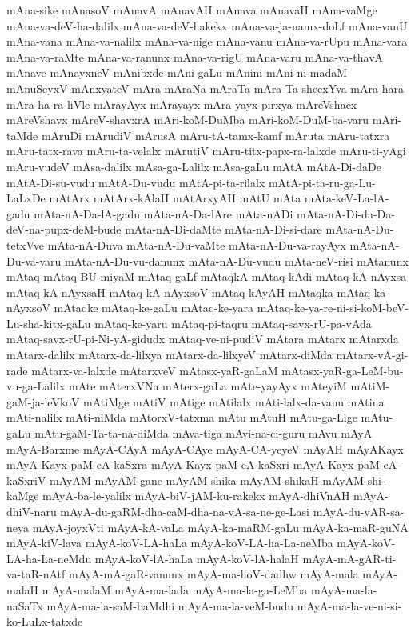 {mAna-sike
mAnasoV
mAnavA
mAnavAH
mAnava
mAnavaH
mAna-vaMge
mAna-va-deV-ha-dalilx
mAna-va-deV-hakekx
mAna-va-ja-namx-doLf
mAna-vanU
mAna-vana
mAna-va-nalilx
mAna-va-nige
mAna-vanu
mAna-va-rUpu
mAna-vara
mAna-va-raMte
mAna-va-ranunx
mAna-va-rigU
mAna-varu
mAna-va-thavA
mAnave
mAnayxneV
mAnibxde
mAni-gaLu
mAnini
mAni-ni-madaM
mAnuSeyxV
mAnxyateV
mAra
mAraNa
mAraTa
mAra-Ta-shecxYva
mAra-hara
mAra-ha-ra-liVle
mArayAyx
mArayayx
mAra-yayx-pirxya
mAreVshacx
mAreVshavx
mAreV-shavxrA
mAri-koM-DuMba
mAri-koM-DuM-ba-varu
mAri-taMde
mAruDi
mArudiV
mArusA
mAru-tA-tamx-kamf
mAruta
mAru-tatxra
mAru-tatx-rava
mAru-ta-velalx
mArutiV
mAru-titx-papx-ra-lalxde
mAru-ti-yAgi
mAru-vudeV
mAsa-dalilx
mAsa-ga-Lalilx
mAsa-gaLu
mAtA
mAtA-Di-daDe
mAtA-Di-su-vudu
mAtA-Du-vudu
mAtA-pi-ta-rilalx
mAtA-pi-ta-ru-ga-Lu-LaLxDe
mAtArx
mAtArx-kAlaH
mAtArxyAH
mAtU
mAta
mAta-keV-La-lA-gadu
mAta-nA-Da-lA-gadu
mAta-nA-Da-lAre
mAta-nADi
mAta-nA-Di-da-Da-deV-na-pupx-deM-bude
mAta-nA-Di-daMte
mAta-nA-Di-si-dare
mAta-nA-Du-tetxVve
mAta-nA-Duva
mAta-nA-Du-vaMte
mAta-nA-Du-va-rayAyx
mAta-nA-Du-va-varu
mAta-nA-Du-vu-danunx
mAta-nA-Du-vudu
mAta-neV-risi
mAtanunx
mAtaq
mAtaq-BU-miyaM
mAtaq-gaLf
mAtaqkA
mAtaq-kAdi
mAtaq-kA-nAyxsa
mAtaq-kA-nAyxsaH
mAtaq-kA-nAyxsoV
mAtaq-kAyAH
mAtaqka
mAtaq-ka-nAyxsoV
mAtaqke
mAtaq-ke-gaLu
mAtaq-ke-yara
mAtaq-ke-ya-re-ni-si-koM-beV-Lu-sha-kitx-gaLu
mAtaq-ke-yaru
mAtaq-pi-taqru
mAtaq-savx-rU-pa-vAda
mAtaq-savx-rU-pi-Ni-yA-gidudx
mAtaq-ve-ni-pudiV
mAtara
mAtarx
mAtarxda
mAtarx-dalilx
mAtarx-da-lilxya
mAtarx-da-lilxyeV
mAtarx-diMda
mAtarx-vA-gi-rade
mAtarx-va-lalxde
mAtarxveV
mAtasx-yaR-gaLaM
mAtasx-yaR-ga-LeM-bu-vu-ga-Lalilx
mAte
mAterxVNa
mAterx-gaLa
mAte-yayAyx
mAteyiM
mAtiM-gaM-ja-leVkoV
mAtiMge
mAtiV
mAtige
mAtilalx
mAti-lalx-da-vanu
mAtina
mAti-nalilx
mAti-niMda
mAtorxV-tatxma
mAtu
mAtuH
mAtu-ga-Lige
mAtu-gaLu
mAtu-gaM-Ta-ta-na-diMda
mAva-tiga
mAvi-na-ci-guru
mAvu
mAyA
mAyA-Barxme
mAyA-CAyA
mAyA-CAye
mAyA-CA-yeyeV
mAyAH
mAyAKayx
mAyA-Kayx-paM-cA-kaSxra
mAyA-Kayx-paM-cA-kaSxri
mAyA-Kayx-paM-cA-kaSxriV
mAyAM
mAyAM-gane
mAyAM-shika
mAyAM-shikaH
mAyAM-shi-kaMge
mAyA-ba-le-yalilx
mAyA-biV-jAM-ku-rakekx
mAyA-dhiVnAH
mAyA-dhiV-naru
mAyA-du-gaRM-dha-caM-dha-na-vA-sa-ne-ge-Lasi
mAyA-du-vAR-sa-neya
mAyA-joyxVti
mAyA-kA-vaLa
mAyA-ka-maRM-gaLu
mAyA-ka-maR-guNA
mAyA-kiV-lava
mAyA-koV-LA-haLa
mAyA-koV-LA-ha-La-neMba
mAyA-koV-LA-ha-La-neMdu
mAyA-koV-lA-haLa
mAyA-koV-lA-halaH
mAyA-mA-gAR-ti-va-taR-nAtf
mAyA-mA-gaR-vanunx
mAyA-ma-hoV-dadhw
mAyA-mala
mAyA-malaH
mAyA-malaM
mAyA-ma-lada
mAyA-ma-la-ga-LeMba
mAyA-ma-la-naSaTx
mAyA-ma-la-saM-baMdhi
mAyA-ma-la-veM-budu
mAyA-ma-la-ve-ni-si-ko-LuLx-tatxde
}
